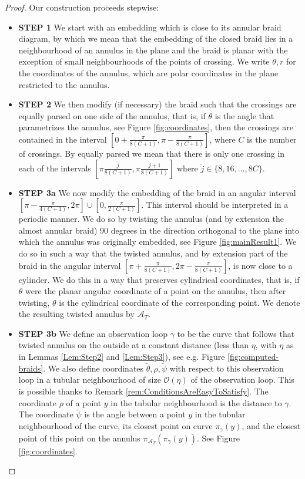 \documentclass[twoside,leqno]{article}
\begin{document}
\begin{proof}
%
%
Our construction proceeds stepwise: 
\begin{itemize} 
\item \textbf{STEP 1} We start with an embedding which is close to its annular braid  diagram, by which we mean that the embedding of the closed braid lies in a neighbourhood of an annulus in the plane and the braid is planar with the exception of small neighbourhoods of the points of crossing. We write $\theta, r$ for the coordinates of the annulus, which are polar coordinates in the plane restricted to the annulus.
\item \textbf{STEP 2} We then modify (if necessary) the braid such that the crossings are equally parsed on one side of the annulus, that is, if $\theta$ is the angle that parametrizes the annulus, see Figure \ref{fig:coordinates}, then the crossings are contained in the interval $[0+\frac{\pi}{8(C+1)} , \pi-\frac{\pi}{8(C+1)}]$, where $C$ is the number of crossings. 
By equally parsed we mean that there is only one crossing in each of the intervals $[ \pi \frac{\tilde{j} }{8 (C+1)} , \pi \frac{\tilde{j}+1}{8 (C+1)}  ]$ where $\tilde{j} \in \{  8, 16, \dots , 8 C\}$. 
%
\item \textbf{STEP 3a} We now modify the embedding of the braid in an angular interval $[\pi-\frac{\pi}{4 (C+1)} , 2 \pi ] \cup [0, \frac{\pi}{2(C+1)}]$. This interval should be interpreted in a periodic manner. 
%
We do so by twisting the annulus (and by extension the almost annular braid) $90$ degrees in the direction orthogonal to the plane into which the annulus was originally embedded, see Figure \ref{fig:mainResult1}. We do so in such a way that the twisted annulus, and by extension part of the braid in the angular interval $[\pi+\frac{\pi}{8 (C+1)}, 2 \pi -\frac{\pi}{8 (C+1)}]$,  is now close to a cylinder. We do this in a way that preserves cylindrical coordinates, that is, if $\theta$ were the planar angular coordinate of a point on the annulus, then after twisting, $\theta$ is the cylindrical coordinate of the corresponding point. 
We denote the resulting twisted annulus by $\mathcal{A}_T$. 
\item \textbf{STEP 3b} We define an observation loop $\gamma$ to be the curve that follows that twisted annulus on the outside at a constant distance (less than $\eta$, with $\eta$ as in Lemmas \ref{Lem:Step2} and \ref{Lem:Step3}), see e.g. Figure \ref{fig:computed-braids}. %
We also define coordinates $\tilde{\theta}, \rho, \tilde{\psi}$ with respect to this {observation loop}  in a tubular neighbourhood of size $\mathcal{O}(\eta)$ 
%
of the observation loop. 
This is possible thanks to Remark \ref{rem:ConditionsAreEasyToSatisfy}. The coordinate $\rho$ of a point $y$ in the tubular neighbourhood is the distance to $\gamma$. The coordinate  
 $\tilde{\psi}$ is the angle between a point $y$ in the tubular neighbourhood of the curve, its closest point on curve $\pi_{\gamma} (y)$, and the closest point of this point on the annulus $\pi_{\mathcal{A}_T}( \pi_{\gamma} (y))$. See Figure \ref{fig:coordinates}.
 

\end{itemize}
\end{proof}
\end{document}
